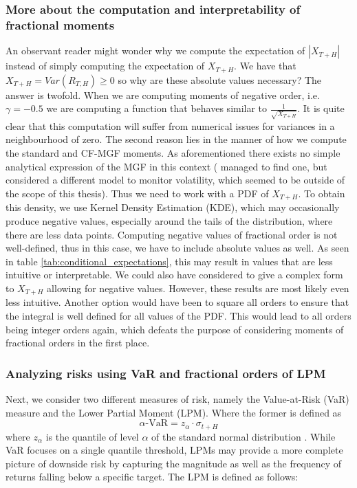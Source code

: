 \subsubsection{More about the computation and interpretability of fractional moments}
An observant reader might wonder why we compute the expectation of \(| X_{T + H}|\) instead of simply computing the expectation of \( X_{T + H}\). We have that \(X_{T+H} = Var(R_{T,H}) \geq 0\) so why are these absolute values necessary? The answer is twofold. When we are computing moments of negative order, i.e. \(\gamma = -0.5\) we are computing a function that behaves similar to \(\displaystyle \frac{1}{\sqrt{X_{T+H}}}\). It is quite clear that this computation will suffer from numerical issues for variances in a neighbourhood of zero. The second reason lies in the manner of how we compute the standard and CF-MGF moments. As aforementioned there exists no simple analytical expression of the MGF in this context ( \cite{hansen2024} managed to find one, but considered a different model to monitor volatility, which seemed to be outside of the scope of this thesis). Thus we need to work with a PDF of \(X_{T+H}\). To obtain this density, we use Kernel Density Estimation (KDE), which may occasionally produce negative values, especially around the tails of the distribution, where there are less data points. Computing negative values of fractional order is not well-defined, thus in this case, we have to include absolute values as well. As seen in table \ref{tab:conditional_expectations}, this may result in values that are less intuitive or interpretable. We could also have considered to give a complex form to \(X_{T+H}\) allowing for negative values. However, these results are most likely even less intuitive. Another option would have been to square all orders to ensure that the integral is well defined for all values of the PDF. This would lead to all orders being integer orders again, which defeats the purpose of considering moments of fractional orders in the first place.

\subsubsection{Analyzing risks using VaR and fractional orders of LPM}
Next, we consider two different measures of risk, namely the Value-at-Risk (VaR) measure and the Lower Partial Moment (LPM). Where the former is defined as 
\begin{equation}
    \alpha\text{-VaR} = z_\alpha \cdot \sigma_{t + H} 
\end{equation}
 where \(z_\alpha\) is the quantile of level \(\alpha\) of the standard normal distribution \cite{holton2013}.
While VaR focuses on a single quantile threshold, LPMs may provide a more complete picture of downside risk by capturing the magnitude as well as the frequency of returns falling below a specific target. The LPM is defined as follows:

